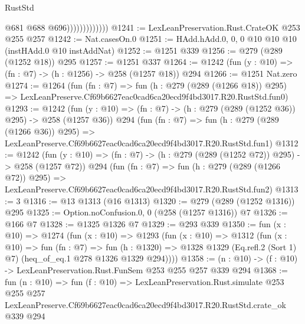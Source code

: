 \begin{lexlean}{RustStd}
\begin{coremodule}
                              @681
                              @688
                              @696)))))))))))))
@1241 := LexLeanPreservation.Rust.CrateOK @253 @255 @257
@1242 := Nat.casesOn.{0}
@1251 := HAdd.hAdd.{0, 0, 0} @10 @10 @10 (instHAdd.{0} @10 instAddNat)
@1252 := @1251 @339
@1256 := @279 (@289 (@1252 @18)) @295
@1257 := @1251 @337
@1264 := @1242 (fun (y : @10) => (fn : @7) -> (h : @1256) -> @258 (@1257 @18)) @294
@1266 := @1251 Nat.zero
@1274 := @1264
    (fun (fn : @7) =>
    fun (h : @279 (@289 (@1266 @18)) @295) =>
    LexLeanPreserve.Cf69b6627eac0cad6ca20ecd9f4bd3017.R20.RustStd.fun0)
@1293 := @1242
    (fun (y : @10) => (fn : @7) -> (h : @279 (@289 (@1252 @36)) @295) -> @258 (@1257 @36))
    @294
    (fun (fn : @7) =>
    fun (h : @279 (@289 (@1266 @36)) @295) =>
    LexLeanPreserve.Cf69b6627eac0cad6ca20ecd9f4bd3017.R20.RustStd.fun1)
@1312 := @1242
    (fun (y : @10) => (fn : @7) -> (h : @279 (@289 (@1252 @72)) @295) -> @258 (@1257 @72))
    @294
    (fun (fn : @7) =>
    fun (h : @279 (@289 (@1266 @72)) @295) =>
    LexLeanPreserve.Cf69b6627eac0cad6ca20ecd9f4bd3017.R20.RustStd.fun2)
@1313 := 3
@1316 := @13 @1313 (@16 @1313)
@1320 := @279 (@289 (@1252 @1316)) @295
@1325 := Option.noConfusion.{0, 0} (@258 (@1257 @1316)) @7
@1326 := @166 @7
@1328 := @1325 @1326 @7
@1329 := @293 @339
@1350 := fun (x : @10) =>
  @1274
    (fun (x : @10) =>
    @1293
      (fun (x : @10) =>
      @1312
        (fun (x : @10) =>
        fun (fn : @7) =>
        fun (h : @1320) =>
        @1328 @1329 (Eq.refl.{2} (Sort 1) @7) (heq_of_eq.{1} @278 @1326 @1329 @294))))
@1358 := (n : @10) -> (f : @10) -> LexLeanPreservation.Rust.FunSem @253 @255 @257 @339 @294
@1368 := fun (n : @10) =>
  fun (f : @10) =>
  LexLeanPreservation.Rust.simulate
    @253
    @255
    @257
    LexLeanPreserve.Cf69b6627eac0cad6ca20ecd9f4bd3017.R20.RustStd.crate_ok
    @339
    @294
\end{coremodule}
\end{lexlean}
